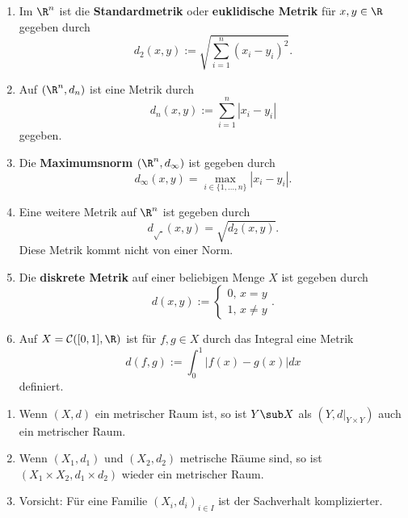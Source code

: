 \begin{beispiele}
\begin{enumerate}
\item Im $\R^n$ ist die \textbf{Standardmetrik} oder \textbf{euklidische Metrik} für $x,y \in \R$ gegeben durch 
\begin{equation}
d_2(x,y) := \sqrt{\sum_{i=1}^n (x_i-y_i)^2}.
\end{equation}
\item Auf $(\R^n, d_n)$ ist eine Metrik durch \begin{equation}
d_n(x,y) := \sum_{i=1}^n |x_i - y_i|
\end{equation}
gegeben.
\item Die \textbf{Maximumsnorm} $(\R^n, d_\infty)$ ist gegeben durch 
\begin{equation}
d_\infty (x,y) = \max_{i \in \{1,\dots, n\}} |x_i - y_i|.
\end{equation}
\item Eine weitere Metrik auf $\R^n$ ist gegeben durch 
\begin{equation}
d_{\sqrt{\cdot}} (x,y) = \sqrt{d_2(x,y)}.
\end{equation}
Diese Metrik kommt nicht von einer Norm.
\item Die \textbf{diskrete Metrik} auf einer beliebigen Menge $X$ ist gegeben durch 
\begin{equation}
d(x,y) := \begin{cases} 0, \, x = y \\ 1, \, x \neq y \end{cases}.
\end{equation}
\item Auf $X= \mathcal{C} ([0,1], \R)$ ist für $f,g \in X$ durch das Integral eine Metrik 
\begin{equation}
d(f,g) := \int_0^1 |f(x) - g(x)| dx
\end{equation}
definiert.
\end{enumerate}
\end{beispiele}
\begin{bemerkungen}
\begin{enumerate}
\item Wenn $(X,d)$ ein metrischer Raum ist, so ist $Y \sub X$ als $(Y,d|_{Y \times Y})$ auch ein metrischer Raum.
\item Wenn $(X_1, d_1)$ und $(X_2, d_2)$ metrische Räume sind, so ist $(X_1 \times X_2, d_1 \times d_2)$ wieder ein metrischer Raum.
\item Vorsicht: Für eine Familie $(X_i, d_i)_{i \in I}$ ist der Sachverhalt komplizierter.
\end{enumerate}
\end{bemerkungen}
